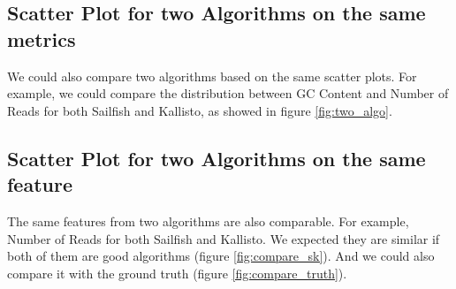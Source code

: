 \documentclass[11pt,letter]{article}
\begin{document}
\subsection {Scatter Plot for two Algorithms on the same metrics}
We could also compare two algorithms based on the same scatter plots. For example, we could compare the distribution between GC Content and Number of Reads for both Sailfish and Kallisto, as showed in figure \ref{fig:two_algo}.



\subsection {Scatter Plot for two Algorithms on the same feature}
The same features from two algorithms are also comparable. For example, Number of Reads for both Sailfish and Kallisto. We expected they are similar if both of them are good algorithms (figure \ref{fig:compare_sk}). And we could also compare it with the ground truth (figure \ref{fig:compare_truth}).
\end{document}
